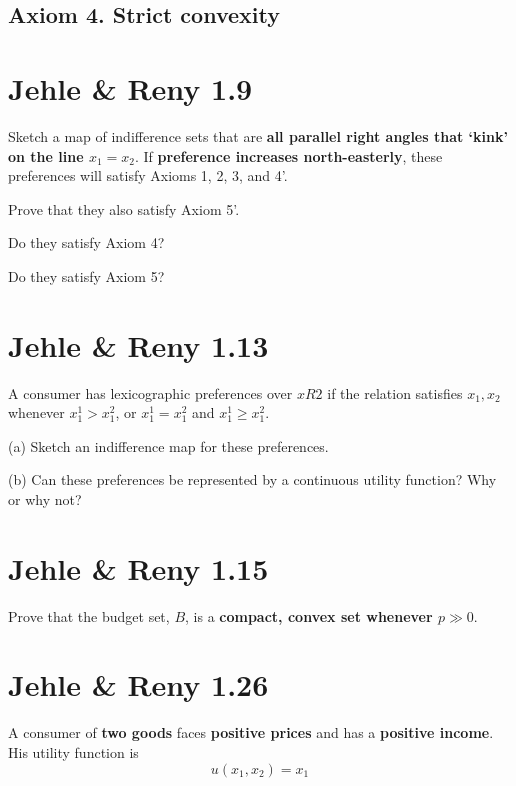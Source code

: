 \documentclass{article}
\begin{document}
\subsection{Axiom 4. Strict convexity}


\section{Jehle \& Reny 1.9}

Sketch a map of indifference sets that are \textbf{all parallel right angles that ‘kink’ on the line $x_1 = x_2$}. If
\textbf{preference increases north-easterly}, these preferences will satisfy Axioms 1, 2, 3, and 4'. 

Prove that they also satisfy Axiom 5'. 

Do they satisfy Axiom 4? 

Do they satisfy Axiom 5?

\section{Jehle \& Reny 1.13}
A consumer has lexicographic preferences over $x R2$ if the relation  satisfies $x_1, x_2$ whenever
$x_1^1 > x_1^2$, or $x_1^1 = x_1^2$ and $x_1^1 \ge x_1^2$.

(a) Sketch an indifference map for these preferences.

(b) Can these preferences be represented by a continuous utility function? Why or why not?


\section{Jehle \& Reny 1.15}
Prove that the budget set, $B$, is a \textbf{compact, convex set whenever $p \gg 0$}.


\section{Jehle \& Reny 1.26}
A consumer of \textbf{two goods} faces \textbf{positive prices} and has a \textbf{positive income}. 
His utility function is $$u(x_1, x_2) = x_1$$ 
\end{document}
